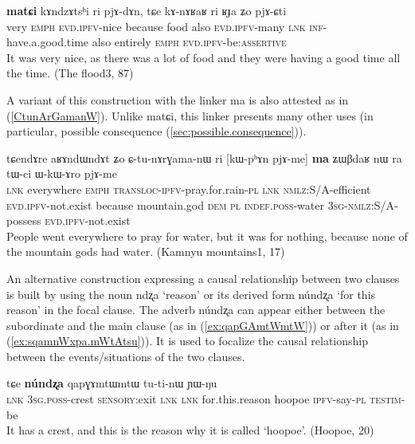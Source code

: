 \documentclass[oldfontcommands,oneside,a4paper,11pt]{article}
\newcommand{\ipa}[1]{{\phon \mbox{#1}}} %
\newcommand{\refb}[1]{(\ref{#1})}
\begin{document}
\begin{exe}
\ex \label{pjAsAscit.matCi}
\gll 
[\ipa{wuma}  	\ipa{ʑo}  	\ipa{pjɤ-sɤscit}]  	\textbf{\ipa{matɕi}}  	\ipa{kɤndzɤtsʰi}  	\ipa{ri}  	\ipa{pjɤ-dɤn}, 	\ipa{tɕe}  	\ipa{kɤ-nɤʁaʁ}  	\ipa{ri}  	\ipa{ʁɟa}  	\ipa{ʑo}  	\ipa{pjɤ-ɕti}  \\
very \textsc{emph} \textsc{evd.ipfv}-nice because food also \textsc{evd.ipfv}-many \textsc{lnk} \textsc{inf}-have.a.good.time also entirely \textsc{emph} \textsc{evd.ipfv}-be:\textsc{assertive}
\\
\glt It was very nice, as there was a lot of food and they were having a good time all the time. (The flood3, 87)
\end{exe}


A variant of this construction with the  linker \ipa{ma} is also attested as in \refb{CtunArGamanW}. Unlike  \ipa{matɕi}, this linker presents many other uses (in particular, possible consequence \refb{sec:possible.consequence}).
 
\begin{exe}
\ex \label{CtunArGamanW}
\gll 
\ipa{tɕendɤre}   	\ipa{aʁɤndɯndɤt}   	\ipa{ʑo}   	\ipa{ɕ-tu-nɤrɣama-nɯ}   	\ipa{ri}   	[\ipa{kɯ-pʰɤn}   	\ipa{pjɤ-me}]   	\ipa{\textbf{ma}}   	\ipa{ʑɯβdaʁ}   	\ipa{nɯ} \ipa{ra}   	\ipa{tɯ-ci}   	\ipa{ɯ-kɯ-ɤro}   	\ipa{pjɤ-me} \\
\textsc{lnk} everywhere \textsc{emph} \textsc{transloc-ipfv}-pray.for.rain-\textsc{pl} \textsc{lnk} \textsc{nmlz}:S/A-efficient \textsc{evd.ipfv}-not.exist because mountain.god \textsc{dem} \textsc{pl} \textsc{indef.poss}-water \textsc{3sg-nmlz}:S/A-possess  \textsc{evd.ipfv}-not.exist  \\
 \glt People went everywhere to pray for water, but it was for nothing, because none of the mountain gods had water. (Kamnyu mountains1, 17)
\end{exe}

An alternative construction expressing a causal relationship between two clauses  is built by using the  noun  \ipa{ndʐa} `reason' or its derived form \ipa{núndʐa} `for this reason' in the focal clause. The adverb \ipa{núndʐa} can appear either between the subordinate and  the main clause (as in \refb{ex:qapGAmtWmtW}) or after it (as in \refb{ex:sqamnWxpa.mWtAtsu}). It is used to focalize the causal relationship between the events/situations of the two clauses.  

\begin{exe}
\ex \label{ex:qapGAmtWmtW}
\gll
[\ipa{tɕe}  	\ipa{ɯ-mtɯ}  	\ipa{ɣɤʑu}]  	\ipa{tɕe,}  	\ipa{tɕe}  	\textbf{\ipa{núndʐa}}  	\ipa{qapɣɤmtɯmtɯ}  	\ipa{tu-ti-nɯ}  	\ipa{ɲɯ-ŋu}   \\
\textsc{lnk} \textsc{3sg.poss}-crest \textsc{sensory}:exit \textsc{lnk} \textsc{lnk} for.this.reason hoopoe \textsc{ipfv}-say-\textsc{pl} \textsc{testim}-be \\
\glt It has a crest, and this is the reason why it is called `hoopoe'. (Hoopoe, 20)
\end{exe}
\end{document}
